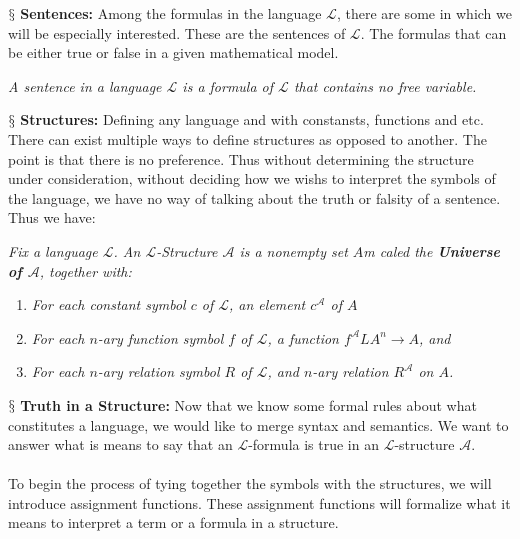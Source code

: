 \documentclass[10pt,a4paper]{article}
\newcommand{\newpoint}[1]{\indent$\mathsection$ \textbf{#1}}
\newcommand{\curveL}{\mathcal{L}}
\newcommand{\curveA}{\mathcal{A}}
\begin{document}
                    \newpoint{Sentences:} Among the formulas in the language $\curveL$, there are some in which we will be especially interested. These are the sentences of $\curveL$. The formulas that can be either true or false in a given mathematical model.\cite{Leary2019-ip}
                    \begin{define}
                        \textit{A sentence in a language $\curveL$ is a formula of $\curveL$ that contains no free variable.}
                    \end{define}
                    \newpoint{Structures: } Defining any language and with constansts, functions and etc. There can exist multiple ways to define structures as opposed to another. The point is that there is no preference. Thus without determining the structure under consideration, without deciding how we wishs to interpret the symbols of the language, we have no way of talking about the truth or falsity of a sentence. Thus we have:
                    \begin{define}
                        \textit{Fix a language $\curveL$. An $\curveL$-Structure $\curveA$ is a nonempty set $A$m caled the \textbf{Universe of $\curveA$}, together with:}
                        \begin{enumerate}
                            \item \textit{For each constant symbol $c$ of $\curveL$, an element $c^\curveA$ of $A$}
                            \item \textit{For each $n$-ary function symbol $f$ of $\curveL$, a function $f^\curveA L A^n\rightarrow A$, and }
                            \item \textit{For each $n$-ary relation symbol $R$ of $\curveL$, and $n$-ary relation $R^\curveA$ on $A$.}
                        \end{enumerate}
                    \end{define}
                    \newpoint{Truth in a Structure:} Now that we know some formal rules about what constitutes a language, we would like to merge syntax and semantics. We want to answer what is means to say that an $\curveL$-formula is true in an $\curveL$-structure $\curveA$.
                    \\
                    \\
                    To begin the process of tying together the symbols with the structures, we will introduce assignment functions. These assignment functions will formalize what it means to interpret a term or a formula in a structure.
\end{document}
